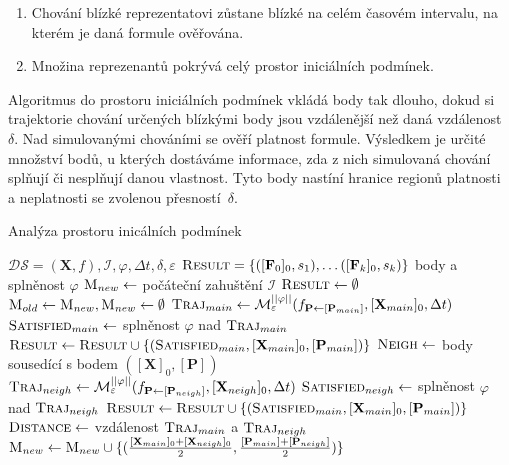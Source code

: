 \begin{enumerate}
	\item	Chování blízké reprezentatovi zůstane blízké na celém časovém intervalu,
			na kterém je daná formule ověřována.
	\item	Množina reprezenantů pokrývá celý prostor iniciálních podmínek.
\end{enumerate}

Algoritmus do prostoru iniciálních podmínek vkládá body tak dlouho, dokud si trajektorie chování
určených blízkými body jsou vzdálenější než daná vzdálenost $\delta$. Nad simulovanými chováními
se ověří platnost formule. Výsledkem je určité množství bodů, u kterých dostáváme informace,
zda z nich simulovaná chování splňují či nesplňují danou vlastnost. Tyto body nastíní
hranice regionů platnosti a neplatnosti se zvolenou přes\-nos\-tí~$\delta$.

\begin{algorithm}
\label{algorithm:main:original}
\caption{Analýza prostoru inicálních podmínek}
\begin{algorithmic}[1]
\Require 	$\mathcal{DS} = (\mathbf{X}, f), \mathcal{I}, \varphi, \Delta t, \delta, \varepsilon$
\Ensure 	$\textsc{Result} = \{([\mathbf{F}_0]_0, s_1), \ldots ([\mathbf{F}_k]_0, s_k)\}$ \Comment body a splněnost $\varphi$
\State		$\textsc{M}_{new} 	\gets $ počáteční zahuštění $\mathcal{I}$
\State		$\textsc{Result} \gets \emptyset$
	\State $\textsc{M}_{old} \gets \textsc{M}_{new}, \textsc{M}_{new} \gets \emptyset$
		\State $\textsc{Traj}_{main} \gets \mathcal{M}^{||\varphi||}_\varepsilon(f_{\mathbf{P} \gets [\mathbf{P}_{main}]}, [\mathbf{X}_{main}]_0, \Delta t)$
		\State $\textsc{Satisfied}_{main} \gets $ splněnost $\varphi$ nad $\textsc{Traj}_{main}$
		\State $\textsc{Result} \gets \textsc{Result} \cup \{(\textsc{Satisfied}_{main}, [\mathbf{X}_{main}]_0, [\mathbf{P}_{main}])\}$
		\State $\textsc{Neigh} \gets $ body sousedící s bodem $([\mathbf{X}]_0, [\mathbf{P}])$
			\State $\textsc{Traj}_{neigh} \gets \mathcal{M}^{||\varphi||}_\varepsilon(f_{\mathbf{P} \gets [\mathbf{P}_{neigh}]}, [\mathbf{X}_{neigh}]_0, \Delta t)$
			\State $\textsc{Satisfied}_{neigh} \gets $ splněnost $\varphi$ nad $\textsc{Traj}_{neigh}$
			\State $\textsc{Result} \gets \textsc{Result} \cup \{(\textsc{Satisfied}_{main}, [\mathbf{X}_{main}]_0, [\mathbf{P}_{main}])\}$
			\State $\textsc{Distance} \gets $ vzdálenost $\textsc{Traj}_{main}$ a $\textsc{Traj}_{neigh}$\label{algorithm:line:trajectory:distance}
				\State	$\textsc{M}_{new} \gets \textsc{M}_{new} \cup \{(\frac{[\mathbf{X}_{main}]_0 + [\mathbf{X}_{neigh}]_0}{2}, \frac{[\mathbf{P}_{main}] + [\mathbf{P}_{neigh}]}{2})\}$
			\EndIf
		\EndFor
	\EndFor
\EndWhile
\end{algorithmic}
\end{algorithm}

